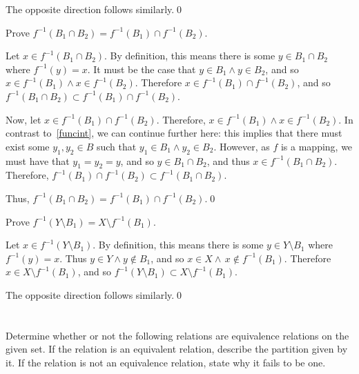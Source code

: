 \begin{exlist}
    \medskip

    The opposite direction follows similarly.\qed
    \item Prove $f^{-1}(B_1 \cap B_2) = f^{-1}(B_1) \cap f^{-1}(B_2)$.
    \hrlist

    Let $x \in f^{-1}(B_1 \cap B_2)$. By definition, this means there is some $y \in B_1 \cap B_2$ where $f^{-1}(y) = x$. It must be the case that $y \in B_1 \land y \in B_2$, and so $x \in f^{-1}(B_1) \land x \in f^{-1}(B_2)$. Therefore $x \in f^{-1}(B_1) \cap f^{-1}(B_2)$, and so $f^{-1}(B_1 \cap B_2) \subset f^{-1}(B_1) \cap f^{-1}(B_2)$.

    \medskip

    Now, let $x \in f^{-1}(B_1) \cap f^{-1}(B_2)$. Therefore, $x \in f^{-1}(B_1) \land x \in f^{-1}(B_2)$. In contrast to~\ref{funcint}, we can continue further here: this implies that there must exist some $y_1, y_2 \in B$ such that $y_1 \in B_1 \land y_2 \in B_2$. However, as $f$ is a mapping, we must have that $y_1 = y_2 = y$, and so $y \in B_1 \cap B_2$, and thus $x \in f^{-1}(B_1 \cap B_2)$. Therefore, $f^{-1}(B_1) \cap f^{-1}(B_2) \subset f^{-1}(B_1 \cap B_2)$.

    \medskip

    Thus, $f^{-1}(B_1 \cap B_2) = f^{-1}(B_1) \cap f^{-1}(B_2)$.\qed
    \pagebreak
    \item Prove $f^{-1}(Y \setminus B_1) = X \setminus f^{-1}(B_1)$.
    \hrlist

    Let $x \in f^{-1}(Y \setminus B_1)$. By definition, this means there is some $y \in Y \setminus B_1$ where $f^{-1}(y) = x$. Thus $y \in Y \land y \notin B_1$, and so $x \in X \land\,x \notin f^{-1}(B_1)$. Therefore $x \in X \setminus f^{-1}(B_1)$, and so $f^{-1}(Y \setminus B_1) \subset X \setminus f^{-1}(B_1)$.

    \medskip

    The opposite direction follows similarly.\qed
\end{exlist}

\section{}\label{sec:1-25}

Determine whether or not the following relations are equivalence relations on the given set. If the relation is an equivalent relation, describe the partition given by it. If the relation is not an equivalence relation, state why it fails to be one.

